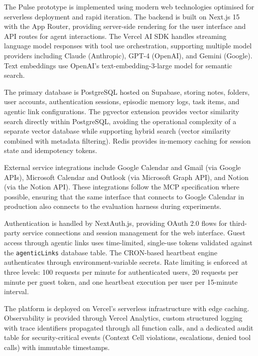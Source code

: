 \documentclass[11pt]{article}
\begin{document}
The Pulse prototype is implemented using modern web technologies optimised for serverless deployment and rapid iteration. The backend is built on Next.js 15 with the App Router, providing server-side rendering for the user interface and API routes for agent interactions. The Vercel AI SDK handles streaming language model responses with tool use orchestration, supporting multiple model providers including Claude (Anthropic), GPT-4 (OpenAI), and Gemini (Google). Text embeddings use OpenAI's text-embedding-3-large model for semantic search.

The primary database is PostgreSQL hosted on Supabase, storing notes, folders, user accounts, authentication sessions, episodic memory logs, task items, and agentic link configurations. The pgvector extension provides vector similarity search directly within PostgreSQL, avoiding the operational complexity of a separate vector database while supporting hybrid search (vector similarity combined with metadata filtering). Redis provides in-memory caching for session state and idempotency tokens.

External service integrations include Google Calendar and Gmail (via Google APIs), Microsoft Calendar and Outlook (via Microsoft Graph API), and Notion (via the Notion API). These integrations follow the MCP specification where possible, ensuring that the same interface that connects to Google Calendar in production also connects to the evaluation harness during experiments.

Authentication is handled by NextAuth.js, providing OAuth 2.0 flows for third-party service connections and session management for the web interface. Guest access through agentic links uses time-limited, single-use tokens validated against the \texttt{agenticLinks} database table. The CRON-based heartbeat engine authenticates through environment-variable secrets. Rate limiting is enforced at three levels: 100 requests per minute for authenticated users, 20 requests per minute per guest token, and one heartbeat execution per user per 15-minute interval.

The platform is deployed on Vercel's serverless infrastructure with edge caching. Observability is provided through Vercel Analytics, custom structured logging with trace identifiers propagated through all function calls, and a dedicated audit table for security-critical events (Context Cell violations, escalations, denied tool calls) with immutable timestamps.
\end{document}
